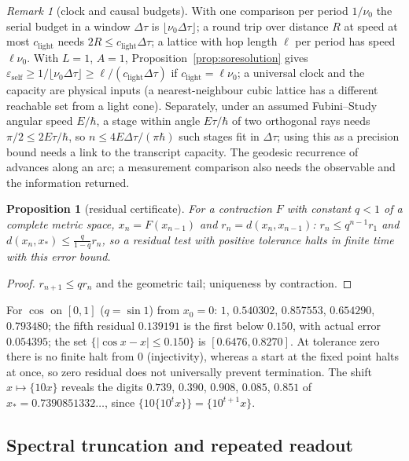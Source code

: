 \documentclass[aps,pra,onecolumn,superscriptaddress,nofootinbib,10pt]{revtex4-2}
\newtheorem{proposition}[theorem]{Proposition}
\theoremstyle{definition}
\theoremstyle{remark}
\newtheorem{remark}[theorem]{Remark}
\begin{document}
\begin{remark}[clock and causal budgets]\label{rem:soclock}
With one comparison per period $1/\nu_0$ the serial budget in a window $\Delta\tau$ is $\lfloor\nu_0\Delta\tau\rfloor$; a round trip over distance $R$
at speed at most $c_{\mathrm{light}}$ needs $2R\le c_{\mathrm{light}}\Delta\tau$; a lattice with hop length $\ell$ per period has speed $\ell\nu_0$.  With $L=1$, $A=1$,
Proposition~\ref{prop:soresolution} gives $\varepsilon_{\mathrm{self}}\ge1/\lfloor\nu_0\Delta\tau\rfloor\ge\ell/(c_{\mathrm{light}}\Delta\tau)$ if $c_{\mathrm{light}}=\ell\nu_0$; a universal clock and the
capacity are physical inputs (a nearest-neighbour cubic lattice has a different reachable set from a light
cone).  Separately, under an assumed Fubini--Study angular speed $E/\hbar$, a stage within angle $E\tau/\hbar$ of two
orthogonal rays needs $\pi/2\le2E\tau/\hbar$, so $n\le4E\Delta\tau/(\pi\hbar)$ such stages fit in $\Delta\tau$; using this as a precision bound
needs a link to the transcript capacity.  The geodesic recurrence of \cite[Thm.~6.2]{PaperI} advances along
an arc; a measurement comparison also needs the observable and the information returned.
\end{remark}

\begin{proposition}[residual certificate]\label{prop:soresidual}
For a contraction $F$ with constant $q<1$ of a complete metric space, $x_n=F(x_{n-1})$ and $r_n=d(x_n,x_{n-1})$: $r_n\le q^{n-1}r_1$
and $d(x_n,x_*)\le\frac q{1-q}r_n$, so a residual test with positive tolerance halts in finite time with this error bound.
\end{proposition}
\begin{proof}
$r_{n+1}\le qr_n$ and the geometric tail; uniqueness by contraction.
\end{proof}
\noindent For $\cos$ on $[0,1]$ ($q=\sin1$) from $x_0=0$: $1$, $0.540302$, $0.857553$, $0.654290$, $0.793480$; the fifth residual $0.139191$ is the
first below $0.150$, with actual error $0.054395$; the set $\{\lvert\cos x-x\rvert\le0.150\}$ is $[0.6476,0.8270]$.  At tolerance zero there is
no finite halt from $0$ (injectivity), whereas a start at the fixed point halts at once, so zero residual does
not universally prevent termination.  The shift $x\mapsto\{10x\}$ reveals the digits $0.739$, $0.390$, $0.908$, $0.085$, $0.851$ of
$x_*=0.7390851332\ldots$, since $\{10\{10^tx\}\}=\{10^{t+1}x\}$.

\subsection{Spectral truncation and repeated readout}\label{sec:sospectra}
\end{document}
